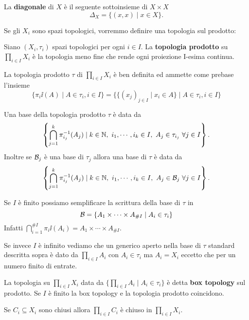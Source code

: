 \begin{multicols*}{2}
\begin{definition}[Diagonale]
La \textbf{diagonale} di $X$ è il seguente sottoinsieme di $X\times X$
\[\Delta_X=\{(x,x)\mid x\in X\}.\]
\end{definition}

Se gli $X_i$ sono spazi topologici, vorremmo definire una topologia sul prodotto:
\begin{definition}
Siano $(X_i,\tau_i)$ spazi topologici per ogni $i\in I$. La \textbf{topologia prodotto} su $\prod_{i\in I}X_i$ è la topologia meno fine che rende ogni proiezione I-esima continua.
\end{definition}
\begin{proposition}
La topologia prodotto $\tau$ di $\prod_{i\in I}X_i$ è ben definita ed ammette come prebase l'insieme
\[\{\pi_i\ii(A)\mid A\in \tau_i,i\in I\}=\{\{(x_j)_{j\in I}\mid x_i\in A\}\mid A\in \tau_i,i\in I\}\]
\end{proposition}
\begin{corollary}
Una base della topologia prodotto $\tau$ è data da
\[\left\{\bigcap_{j=1}^k\pi_{i_j}^{-1}(A_j)\mid k\in \mathbb{N},\ i_1,\cdots,i_k\in I,\ A_j\in \tau_{i_j}\ \forall j\in I\right\}.\]
Inoltre se $\mathcal{B}_j$ è una base di $\tau_j$ allora una base di $\tau$ è data da
\[\left\{\bigcap_{j=1}^k\pi_{i_j}^{-1}(A_j)\mid k\in \mathbb{N},\ i_1,\cdots,i_k\in I,\ A_j\in \mathcal{B}_j\ \forall j\in I\right\}.\]
\end{corollary}

\begin{remark}
Se $I$ è finito possiamo semplificare la scrittura della base di $\tau$ in
\[\mathcal{B}=\{A_1\times \cdots\times A_{\#I}\mid A_i\in \tau_i\}\]
Infatti $\bigcap_{i=1}^{\#I}\pi_{i}\ii(A_i)=A_1\times \cdots \times A_{\# I}$.\smallskip

\noindent
Se invece $I$ è infinito vediamo che un generico aperto nella base di $\tau$ standard descritta sopra è dato da $\prod_{i\in I}A_i$ con $A_i\in \tau_i$ ma $A_i=X_i$ eccetto che per un numero finito di entrate.
\end{remark}

\begin{definition}
La topologia su $\prod_{i\in I}X_i$ data da $\{\prod_{i\in I}A_i\mid A_i\in \tau_i\}$ è detta \textbf{box topology} sul prodotto. Se $I$ è finito la box topology e la topologia prodotto coincidono.
\end{definition}

\begin{proposition}\label{ProdottoDiChiusiEChiuso}
Se $C_i\subseteq X_i$ sono chiusi allora $\prod_{i\in I}C_i$ è chiuso in $\prod_{i\in I}X_i$.
\end{proposition}


\end{multicols*}
